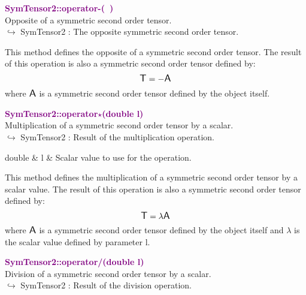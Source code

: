 \textcolor{purple}{\textbf{SymTensor2::operator-(~)}}\label{SymTensor2::operator-()}\\
Opposite of a symmetric second order tensor.\\ \hspace*{10mm}$\hookrightarrow$ SymTensor2 : The opposite symmetric second order tensor.

This method defines the opposite of a symmetric second order tensor.
The result of this operation is also a symmetric second order tensor defined by:
\begin{equation*}
\mbox{\large\ensuremath{\mathsf{T}}} = - \mbox{\large\ensuremath{\mathsf{A}}}
\end{equation*}
where $\mbox{\large\ensuremath{\mathsf{A}}}$ is a symmetric second order tensor defined by the object itself.

\textcolor{purple}{\textbf{SymTensor2::operator$\star$(double l)}}\label{SymTensor2::operator*(double l)}\\
Multiplication of a symmetric second order tensor by a scalar.\\ \hspace*{10mm}$\hookrightarrow$ SymTensor2 : Result of the multiplication operation.

\begin{tcolorbox}[width=\textwidth,myArgs,tabularx={ll|R}]
double & l & Scalar value to use for the operation.
\end{tcolorbox}

This method defines the multiplication of a symmetric second order tensor by a scalar value.
The result of this operation is also a symmetric second order tensor defined by:
\begin{equation*}
\mbox{\large\ensuremath{\mathsf{T}}} = \lambda \mbox{\large\ensuremath{\mathsf{A}}}
\end{equation*}
where $\mbox{\large\ensuremath{\mathsf{A}}}$ is a symmetric second order tensor defined by the object itself and $\lambda$ is the scalar value defined by parameter l.

\textcolor{purple}{\textbf{SymTensor2::operator/(double l)}}\label{SymTensor2::operator/(double l)}\\
Division of a symmetric second order tensor by a scalar.\\ \hspace*{10mm}$\hookrightarrow$ SymTensor2 : Result of the division operation.

